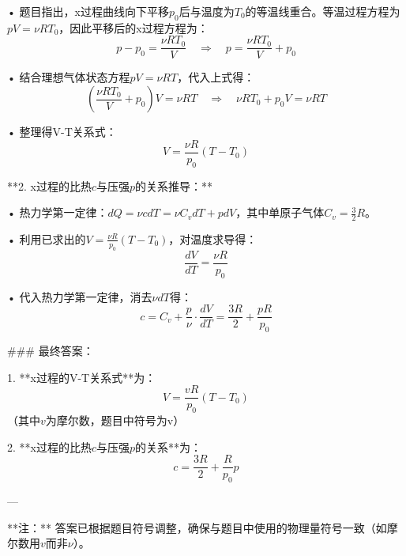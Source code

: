 \documentclass{article}
\begin{document}
• 题目指出，x过程曲线向下平移\( p_0 \)后与温度为\( T_0 \)的等温线重合。等温过程方程为\( pV = \nu R T_0 \)，因此平移后的x过程方程为：
  \[
  p - p_0 = \frac{\nu R T_0}{V} \quad \Rightarrow \quad p = \frac{\nu R T_0}{V} + p_0
  \]
  
• 结合理想气体状态方程\( pV = \nu R T \)，代入上式得：
  \[
  \left( \frac{\nu R T_0}{V} + p_0 \right) V = \nu R T \quad \Rightarrow \quad \nu R T_0 + p_0 V = \nu R T
  \]
  
• 整理得V-T关系式：
  \[
  V = \frac{\nu R}{p_0} (T - T_0)
  \]

**2. x过程的比热\( c \)与压强\( p \)的关系推导：**

• 热力学第一定律：\( dQ = \nu c dT = \nu C_v dT + p dV \)，其中单原子气体\( C_v = \frac{3}{2}R \)。

• 利用已求出的\( V = \frac{\nu R}{p_0} (T - T_0) \)，对温度求导得：
  \[
  \frac{dV}{dT} = \frac{\nu R}{p_0}
  \]

• 代入热力学第一定律，消去\( \nu dT \)得：
  \[
  c = C_v + \frac{p}{\nu} \cdot \frac{dV}{dT} = \frac{3R}{2} + \frac{p R}{p_0}
  \]

### 最终答案：

1. **x过程的V-T关系式**为：
   \[
   V = \frac{v R}{p_0} (T - T_0)
   \]
   （其中\( v \)为摩尔数，题目中符号为v）

2. **x过程的比热\( c \)与压强\( p \)的关系**为：
   \[
   c = \frac{3R}{2} + \frac{R}{p_0} p
   \]

---

**注：** 答案已根据题目符号调整，确保与题目中使用的物理量符号一致（如摩尔数用\( v \)而非\( \nu \)）。
\end{document}
